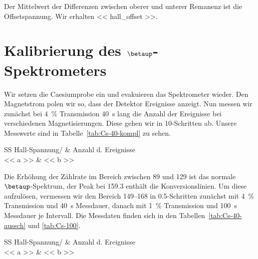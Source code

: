 Der Mittelwert der Differenzen zwischen oberer und unterer Remanenz ist die
Offsetspannung. Wir erhalten \SI{<< hall_offset >>}{\skt}.

\section{Kalibrierung des $\betaup$-Spektrometers}

Wir setzen die Caesiumprobe ein und evakuieren das Spektrometer wieder. Den
Magnetstrom polen wir so, dass der Detektor Ereignisse anzeigt. Nun messen
wir zunächst bei \SI{4}{\percent} Transmission \SI{40}{\second} lang die
Anzahl der Ereignisse bei verschiedenen Magnetisierungen. Diese gehen wir in
\SI{10}{\skt}-Schritten ab. Unsere Messwerte sind in
Tabelle~\ref{tab:Cs-40-kompl} zu sehen.

\begin{table}[htbp]
    \centering
    \begin{tabular}{SS}
        {Hall-Spannung/\si{\skt}} & {Anzahl d. Ereignisse} \\
        \midrule
        << a >> & << b >> \\
    \end{tabular}
    \caption{%
        Messwerte zur Kalibrierung des Spektrometers. Probe: ${}^{137}$Cs,
        Zeit: \SI{40}{\second}, Transmission: \SI{4}{\percent}.
    }
    \label{tab:Cs-40-kompl}
\end{table}

Die Erhöhung der Zählrate im Bereich zwischen \SI{89}{\skt} und
\SI{129}{\skt} ist das normale $\betaup$-Spektrum, der Peak bei
\SI{159.3}{\skt} enthält die Konversionslinien. Um diese aufzulösen,
vermessen wir den Bereich \SIrange{149}{168}{\skt} in \SI{.5}{\skt}-Schritten
zunächst mit \SI{4}{\percent} Transmission und \SI{40}{\second} Messdauer,
danach mit \SI{1}{\percent} Transmission und \SI{100}{\second} Messdauer je
Intervall. Die Messdaten finden sich in den Tabellen~\ref{tab:Cs-40-aussch}
und \ref{tab:Cs-100}.

\begin{table}[htbp]
    \centering
    \begin{tabular}{SS}
        {Hall-Spannung/\si{\skt}} & {Anzahl d. Ereignisse} \\
        \midrule
        << a >> & << b >> \\
    \end{tabular}
    \caption{%
        Messwerte zur Kalibrierung des Spektrometers. Probe: ${}^{137}$Cs,
        Zeit: \SI{40}{\second}, Transmission: \SI{4}{\percent}.
    }
    \label{tab:Cs-40-aussch}
\end{table}

